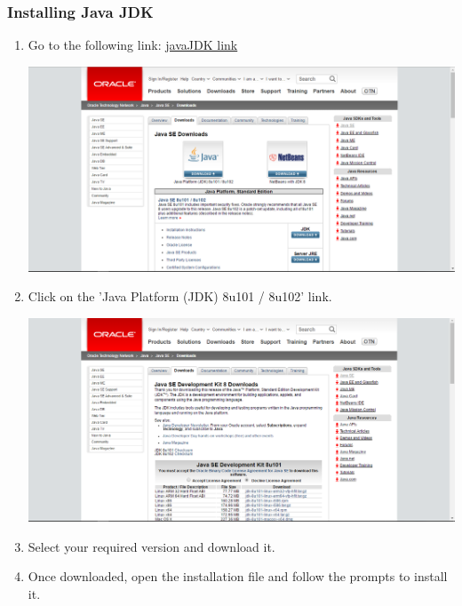 \documentclass[a4paper,12pt]{article}
\begin{document}
\subsubsection{Installing Java JDK}
\begin{enumerate}
\item  Go to the following link: \href{http://www.oracle.com/technetwork/java/javase/downloads/index.html}{javaJDK link}

\includegraphics[width=0.9\linewidth, center]{./Installation/Java_download_1.PNG}\\[0.4cm]

\item Click on the 'Java Platform (JDK) 8u101 / 8u102' link.

\includegraphics[width=0.9\linewidth, center]{./Installation/Java_download_2.PNG}\\[0.4cm]

\item Select your required version and download it.
\item Once downloaded, open the installation file and follow the prompts to install it.
\end{enumerate}

\newpage
\end{document}
